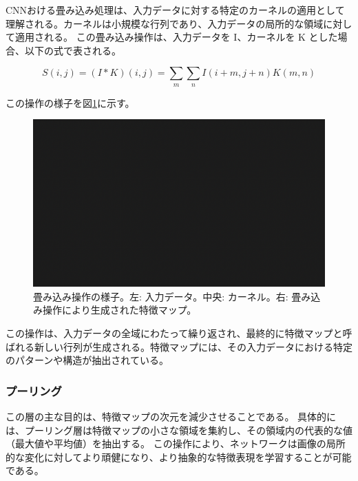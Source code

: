         CNNおける畳み込み処理は、入力データに対する特定のカーネルの適用として理解される。カーネルは小規模な行列であり、入力データの局所的な領域に対して適用される。
        この畳み込み操作は、入力データを I、カーネルを K とした場合、以下の式で表される。

        \begin{equation}
          S(i, j) = (I * K)(i, j) = \sum_{m}\sum_{n}I(i+m, j+n)K(m, n)
        \end{equation}
        
        この操作の様子を図\ref{fig:convolution}に示す。
        \begin{figure}[h]
          \centering
          \includegraphics[width=\textwidth]{figures/sample.png}
          \caption{畳み込み操作の様子。左: 入力データ。中央: カーネル。右: 畳み込み操作により生成された特徴マップ。}
          \label{fig:convolution}
        \end{figure}

        この操作は、入力データの全域にわたって繰り返され、最終的に特徴マップと呼ばれる新しい行列が生成される。特徴マップには、その入力データにおける特定のパターンや構造が抽出されている。
      
      \subsubsection{プーリング}
        この層の主な目的は、特徴マップの次元を減少させることである。
        具体的には、プーリング層は特徴マップの小さな領域を集約し、その領域内の代表的な値（最大値や平均値）を抽出する。
        この操作により、ネットワークは画像の局所的な変化に対してより頑健になり、より抽象的な特徴表現を学習することが可能である。

